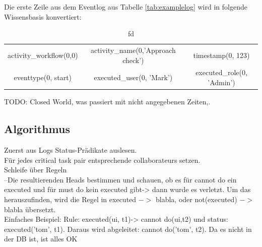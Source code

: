 Die erste Zeile aus dem Eventlog aus Tabelle \ref{tab:examplelog} wird in folgende Wissensbasis konvertiert:
\begin{table}
\begin{tabular}{ccc}
activity{\_}workflow(0,0) & activity{\_}name(0,'Approach check') & timestamp(0, 123)\\ 
eventtype(0, start) & executed{\_}user(0, 'Mark') & executed{\_}role(0, 'Admin') 
\end{tabular}
\caption{fd}
\label{tab:knowledge}
\end{table}



TODO: Closed World, was passiert mit nicht angegebenen Zeiten,.

\subsection{Algorithmus}
Zuerst aus Logs Status-Prädikate auslesen.\\
Für jedes critical task pair entsprechende collaborateurs setzen.\\
Schleife über Regeln\\
--Die resultierenden Heads bestimmen und schauen, ob es für cannot do ein executed und für must do kein executed gibt-> dann wurde es verletzt. Um das herauszufinden, wird die Regel in executed $ - >$ blabla, oder not(executed) $- >$ blabla übersetzt.\\
 
Einfaches Beispiel: Rule: executed(ui, t1)-> cannot do(ui,t2) und status: executed('tom', t1). Daraus wird abgeleitet: cannot do('tom', t2). Da es nicht in der DB ist, ist alles OK
